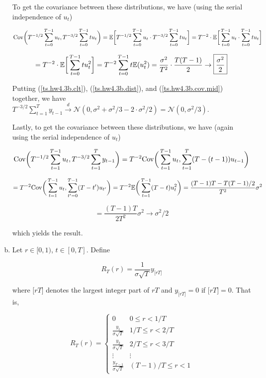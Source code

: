 \begin{enumerate}[(a)]
To get the covariance between these distributions, we have (using the serial independence of \(u_t\))

\[
\mathrm{Cov} \bigg(T^{-1/2}\sum_{t=0}^{T-1} u_t  , T^{-3/2}\sum_{t=0}^{T-1} t u_t \bigg) = \mathbb{E} \bigg[T^{-1/2}\sum_{t=0}^{T-1} u_t  \cdot T^{-3/2}\sum_{t=0}^{T-1} t u_t \bigg] = T^{-2} \cdot \mathbb{E} \bigg[\sum_{t=0}^{T-1} u_t  \cdot \sum_{t=0}^{T-1} t u_t \bigg]
\]

\begin{equation}\label{ts.hw4.3b.cov.mid}
= T^{-2} \cdot \mathbb{E} \bigg[\sum_{t=0}^{T-1} t u_t^2   \bigg]= T^{-2} \sum_{t=0}^{T-1} t  \mathbb{E}( u_t^2) = \frac{\sigma^2}{T^2} \cdot \frac{T(T-1)}{2}  \to \boxed{\frac{ \sigma^2}{2}}
\end{equation}

Putting (\ref{ts.hw4.3b.clt}), (\ref{ts.hw4.3b.dist}), and (\ref{ts.hw4.3b.cov.mid}) together, we have \(T^{-3/2}\sum_{t=1}^T y_{t-1} \xrightarrow{d} \mathcal{N}(0,\sigma^2 + \sigma^2/3 - 2 \cdot \sigma^2/2 ) = \boxed{\mathcal{N}(0, \sigma^2/3)}\).  

Lastly, to get the covariance between these distributions, we have (again using the serial independence of \(u_t\))

\[
\mathrm{Cov} \bigg(T^{-1/2}\sum_{t=1}^{T-1} u_t  , T^{-3/2}\sum_{t=1}^T y_{t-1} \bigg) = T^{-2} \mathrm{Cov} \bigg(\sum_{t=1}^{T-1} u_t  , \sum_{t=1}^T(T - (t - 1)) u_{t-1} \bigg) 
\]

\[
= T^{-2} \mathrm{Cov} \bigg(\sum_{t=1}^{T-1} u_t  , \sum_{t'=0}^{T-1} (T - t') u_{t'} \bigg)  = T^{-2} \mathbb{E} \bigg( \sum_{t=1}^{T-1} (T - t) u_t^2  \bigg) = \frac{(T-1)T - T(T-1)/2}{T^2} \sigma^2 
\]

\begin{equation}\label{ts.hw4.3b.cov.fin}
= \frac{(T-1)T}{2T^2} \sigma^2  \to \boxed{ \sigma^2/2}
\end{equation}

which yields the result.
\item  

 Let \(r \in [0, 1)\), \(t \in [0, T]\). Define

\[
R_T(r) = \frac{1}{\sigma \sqrt{T}} y_{ \big[rT \big] }
\]

where \(\big[rT \big]\) denotes the largest integer part of \(rT\) and \(y_{ \big[rT \big] } = 0\) if \(\big[rT \big] = 0\). That is,

\[
R_T(r) = \begin{cases}
0 & 0 \leq r < 1/T \\
\frac{y_1}{\sigma \sqrt{T}} & 1/T \leq r < 2/T \\
\frac{y_2}{\sigma \sqrt{T}} & 2/T \leq r < 3/T \\
\vdots & \vdots \\
\frac{y_{T-1}}{\sigma \sqrt{T}}& (T-1)/T \leq r < 1
\end{cases}
\]


\end{enumerate}
